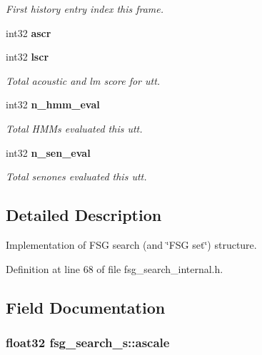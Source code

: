 \begin{DoxyCompactItemize}
\begin{DoxyCompactList}\small\item\em First history entry index this frame. \end{DoxyCompactList}\item 
int32 {\bfseries ascr}\label{structfsg__search__s_aac3c130a5777edd2a227fd064eaefbf2}

\item 
int32 {\bf lscr}\label{structfsg__search__s_a709277a80e9418ecc3e63296f8eb6bbf}

\begin{DoxyCompactList}\small\item\em Total acoustic and lm score for utt. \end{DoxyCompactList}\item 
int32 {\bf n\+\_\+hmm\+\_\+eval}\label{structfsg__search__s_a7e3d7375b4a33af339e8b55885677faa}

\begin{DoxyCompactList}\small\item\em Total H\+M\+Ms evaluated this utt. \end{DoxyCompactList}\item 
int32 {\bf n\+\_\+sen\+\_\+eval}\label{structfsg__search__s_a56494e3b30d0c66367c7ef055b8addb2}

\begin{DoxyCompactList}\small\item\em Total senones evaluated this utt. \end{DoxyCompactList}\end{DoxyCompactItemize}


\subsection{Detailed Description}
Implementation of F\+S\+G search (and \char`\"{}\+F\+S\+G set\char`\"{}) structure. 

Definition at line 68 of file fsg\+\_\+search\+\_\+internal.\+h.



\subsection{Field Documentation}
\subsubsection[{ascale}]{\setlength{\rightskip}{0pt plus 5cm}float32 fsg\+\_\+search\+\_\+s\+::ascale}\label{structfsg__search__s_a4d13fff2e14882b0125386fc27a4097f}


